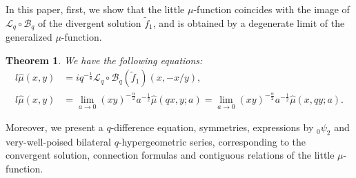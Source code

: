 \documentclass[a4paper]{article}
\numberwithin{equation}{section}
\theoremstyle{plain}
\newtheorem{thm}{Theorem}
\begin{document}
In this paper, first, we show that the little $\mu$-function coincides with the image of $\mathcal{L}_q\circ\mathcal{B}_q$ of the divergent solution $\widetilde{f}_1$, and is obtained by a degenerate limit of the generalized $\mu$-function. 
\begin{thm}
\label{thm: lmu and gmu}
We have the following equations: 
\begin{align}
\label{eq: lmu and divergent series}
  l\widehat{\mu}(x,y)
   &=iq^{-\frac{1}{8}}\mathcal{L}_q\circ\mathcal{B}_q\left(\widetilde{f}_1\right)(x,-x/y)
, \\
\label{eq: lmu and gmu}
l\widehat{\mu}(x,y)
      &=\lim_{a \to 0}
      (xy)^{-\frac{\alpha }{2}}a^{-\frac{1}{2}}
      \widehat{\mu}(q x,y;a)
      =\lim_{a \to 0}
      (xy)^{-\frac{\alpha }{2}}a^{-\frac{1}{2}}
      \widehat{\mu}(x,qy;a). 
\end{align}
\end{thm}
Moreover, we present a $q$-difference equation, symmetries, expressions by ${}_0\psi_2$ and very-well-poised bilateral $q$-hypergeometric series, corresponding to the convergent solution, connection formulas and contiguous relations of the little $\mu$-function. 
\end{document}
